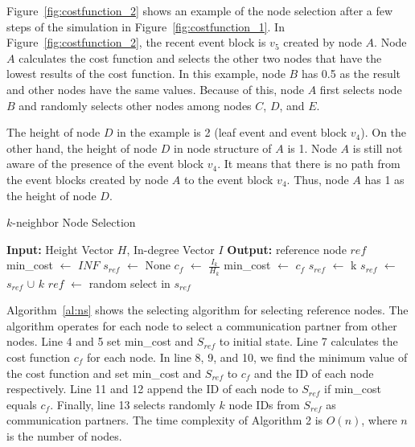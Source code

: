 \documentclass{article}
\begin{document}
Figure~\ref{fig:costfunction_2} shows an example of the node selection after a few steps of the simulation in Figure~\ref{fig:costfunction_1}. In Figure~\ref{fig:costfunction_2}, the recent event block is $v_5$ created by node $A$. Node $A$ calculates the cost function and selects the other two nodes that have the lowest results of the cost function. In this example, node $B$ has 0.5 as the result and other nodes have the same values. Because of this, node $A$ first selects node $B$ and randomly selects other nodes among nodes $C$, $D$, and $E$.

The height of node $D$ in the example is 2 (leaf event and event block $v_4$). On the other hand, the height of node $D$ in node structure of $A$ is 1. Node $A$ is still not aware of the presence of the event block $v_4$. It means that there is no path from the event blocks created by node $A$ to the event block $v_4$. Thus, node $A$ has 1 as the height of node $D$. 

\begin{algorithm}[H]
\caption{$k$-neighbor Node Selection}\label{al:ns}
\begin{algorithmic}[1]
	\State \textbf{Input:} Height Vector $H$, In-degree Vector $I$
	\State \textbf{Output:} reference node $ref$
	\State min\_cost $\leftarrow$ $INF$ 
	\State $s_{ref}$ $\leftarrow$ None
	\State $c_f$ $\leftarrow$ $\frac{I_k}{H_k}$ 
	\State min\_cost $\leftarrow$ $c_f$
	\State $s_{ref}$ $\leftarrow$ {k}
	\State $s_{ref}$ $\leftarrow$ $s_{ref}$ $\cup$ $k$
	\EndIf
	\EndFor
	\State $ref$ $\leftarrow$ random select in $s_{ref}$
	\EndProcedure
\end{algorithmic}
\end{algorithm}

Algorithm~\ref{al:ns} shows the selecting algorithm for selecting reference nodes. The algorithm operates for each node to select a communication partner from other nodes. Line 4 and 5 set min\_cost and $S_{ref}$ to initial state. Line 7 calculates the cost function $c_f$ for each node. In line 8, 9, and 10, we find the minimum value of the cost function and set min\_cost and $S_{ref}$ to $c_f$ and the ID of each node respectively. Line 11 and 12 append the ID of each node to $S_{ref}$ if min\_cost equals $c_f$. Finally, line 13 selects randomly $k$ node IDs from $S_{ref}$ as communication partners. The time complexity of Algorithm 2 is $O(n)$, where $n$ is the number of nodes. 
\end{document}
